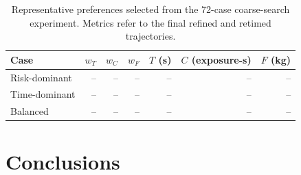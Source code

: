 \documentclass[preprint,12pt]{elsarticle}
\begin{document}
\begin{table}[t]
 \centering
 \caption{Representative preferences selected from the 72-case coarse-search
 experiment. Metrics refer to the final refined and retimed trajectories.}
 \label{tab:representatives}
 \small
 \begin{tabular}{lrrrrrr}
 \hline
 Case & $w_T$ & $w_C$ & $w_F$ & $T$ (s) & $C$ (exposure-s) & $F$ (kg) \\
 \hline
 Risk-dominant & -- & -- & -- & -- & -- & -- \\
 Time-dominant & -- & -- & -- & -- & -- & -- \\
 Balanced & -- & -- & -- & -- & -- & -- \\
 \hline
 \end{tabular}
\end{table}



\section{Conclusions}
\label{sec:conclusions}
\end{document}
